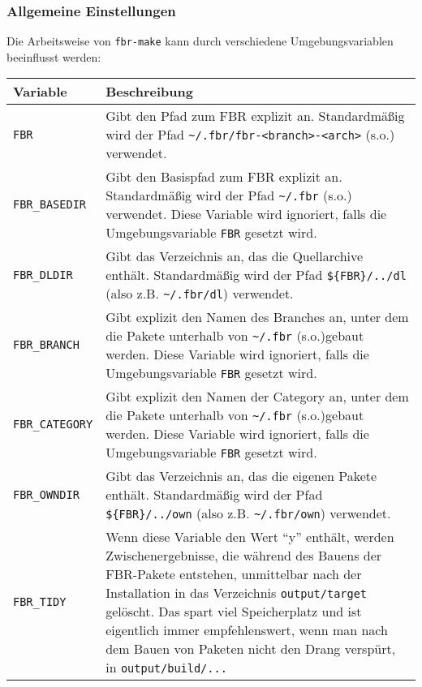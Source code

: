 \subsubsection{Allgemeine Einstellungen}

Die Arbeitsweise von \texttt{fbr-make} kann durch verschiedene
Umgebungsvariablen beeinflusst werden:

\begin{longtable}{|l|p{10cm}|}
    \hline
    \multicolumn{1}{|l}{\textbf{Variable}} &
    \multicolumn{1}{|l|}{\textbf{Beschreibung}} \\
    \hline
    \endhead
    \hline
    \endfoot
    \endlastfoot
\texttt{FBR} &
    Gibt den Pfad zum FBR explizit an. Standardmäßig wird der Pfad
    \texttt{\~{}/.fbr/fbr-<branch>-<arch>} (s.o.) verwendet. \\
\hline
\texttt{FBR\_BASEDIR} &
    Gibt den Basispfad zum FBR explizit an. Standardmäßig wird der Pfad
    \texttt{\~{}/.fbr} (s.o.) verwendet. Diese Variable wird ignoriert, falls
    die Umgebungsvariable \texttt{FBR} gesetzt wird. \\
\hline
\texttt{FBR\_DLDIR} &
    Gibt das Verzeichnis an, das die Quellarchive enthält. Standardmäßig wird
    der Pfad \texttt{\$\{FBR\}/../dl} (also z.B. \texttt{\~{}/.fbr/dl})
    verwendet. \\
\hline
\texttt{FBR\_BRANCH} &
    Gibt explizit den Namen des Branches an, unter dem die Pakete unterhalb von
    \texttt{\~{}/.fbr} (s.o.)gebaut werden. Diese Variable wird ignoriert, falls
    die Umgebungsvariable \texttt{FBR} gesetzt wird. \\
\hline
\texttt{FBR\_CATEGORY} &
    Gibt explizit den Namen der Category an, unter dem die Pakete unterhalb von
    \texttt{\~{}/.fbr} (s.o.)gebaut werden. Diese Variable wird ignoriert, falls
    die Umgebungsvariable \texttt{FBR} gesetzt wird. \\
\hline
\texttt{FBR\_OWNDIR} &
    Gibt das Verzeichnis an, das die eigenen Pakete enthält. Standardmäßig wird
    der Pfad \texttt{\$\{FBR\}/../own} (also z.B. \texttt{\~{}/.fbr/own})
    verwendet. \\
\hline
\texttt{FBR\_TIDY} &
    Wenn diese Variable den Wert ``y'' enthält, werden Zwischenergebnisse, die
    während des Bauens der FBR-Pakete entstehen, unmittelbar nach der
    Installation in das Verzeichnis \texttt{output/target} gelöscht. Das spart
    viel Speicherplatz und ist eigentlich immer empfehlenswert, wenn man nach
    dem Bauen von Paketen nicht den Drang verspürt, in \texttt{output/build/...}

\end{longtable}
